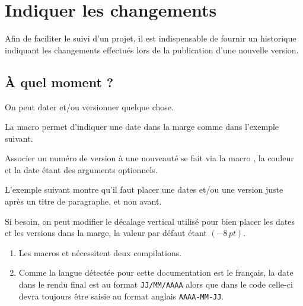 \documentclass{tutodoc}
\begin{document}
\section{Indiquer les changements}
\label{tutodoc-changes}

Afin de faciliter le suivi d'un projet, il est indispensable de fournir un historique indiquant les changements effectués lors de la publication d'une nouvelle version.



\subsection{À quel moment ?}
\label{tutodoc-changes-when}

On peut dater et/ou versionner quelque chose.


\begin{tdocexa}
    La macro  permet d'indiquer une date dans la marge comme dans l'exemple suivant.

\end{tdocexa}


\begin{tdocexa}
    Associer un numéro de version à une nouveauté se fait via la macro , la couleur et la date étant des arguments optionnels.

\end{tdocexa}


\begin{tdocexa}
	L'exemple suivant montre qu'il faut placer une dates et/ou une version juste après un titre de paragraphe, et non avant.

\end{tdocexa}


\begin{tdocexa}
	Si besoin, on peut modifier le décalage vertical utilisé pour bien placer les dates et les versions dans la marge, la valeur par défaut étant $(-8\,\mathit{pt})$.

\end{tdocexa}


\begin{tdocimp}
    \begin{enumerate}[wide]
        \item Les macros  et  nécessitent deux compilations.

        \item Comme la langue détectée pour cette documentation est le français, la date dans le rendu final est au format \texttt{JJ/MM/AAAA} alors que dans le code celle-ci devra toujours être saisie au format anglais \texttt{AAAA-MM-JJ}.
    \end{enumerate}
\end{tdocimp}
\end{document}
